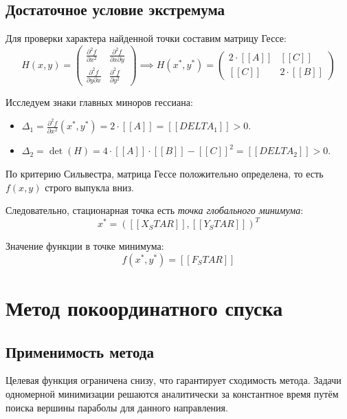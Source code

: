 \documentclass[12pt]{article}
\begin{document}
\subsection{Достаточное условие экстремума}

Для проверки характера найденной точки составим матрицу Гессе:
\begin{equation*}
H(x, y) = \begin{pmatrix}
    \frac{\partial^2 f}{\partial x^2} & \frac{\partial^2 f}{\partial x \partial y} \\[1ex]
    \frac{\partial^2 f}{\partial y \partial x} & \frac{\partial^2 f}{\partial y^2}
\end{pmatrix}
\implies H(x^\ast, y^\ast)=
\begin{pmatrix}
    2 \cdot [[A]] & [[C]] \\
    [[C]] & 2 \cdot [[B]]
\end{pmatrix}
\end{equation*}

Исследуем знаки главных миноров гессиана:
\begin{itemize}
    \item \( \Delta_1 = \frac{\partial^2 f}{\partial x^2}(x^\ast,y^\ast) = 2 \cdot [[A]] = [[DELTA_1]]>0 \).
    \item \( \Delta_2 = \det(H) = 4 \cdot [[A]] \cdot [[B]] - [[C]]^2 = [[DELTA_2]]>0 \).
\end{itemize}

По критерию Сильвестра, матрица Гессе положительно определена, то есть \( f(x,y) \) строго выпукла вниз.

Следовательно, стационарная точка есть \textit{точка глобального минимума}:
\[
x^* = ([[X_STAR]], [[Y_STAR]])^T
\]

Значение функции в точке минимума:
\[
f(x^*, y^*) = [[F_STAR]]
\]

\newpage
\section{Метод покоординатного спуска}

\subsection{Применимость метода}

Целевая функция ограничена снизу, что гарантирует сходимость метода. Задачи одномерной минимизации решаются аналитически за константное время путём поиска вершины параболы для данного направления.
\end{document}
